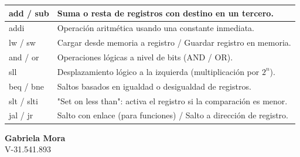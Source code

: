 \documentclass[10pt]{article}
\begin{document}
\vspace{0.6cm}

\begin{center}
    \normalsize 
    \setlength{\tabcolsep}{10pt} 
    \renewcommand{\arraystretch}{1.2} 

    \begin{tabular}{|l|l|}
    \hline
    add / sub & Suma o resta de registros con destino en un tercero. \\ \hline
    addi & Operación aritmética usando una constante inmediata. \\ \hline
    lw / sw & Cargar desde memoria a registro / Guardar registro en memoria. \\ \hline
    and / or & Operaciones lógicas a nivel de bits (AND / OR). \\ \hline
    sll & Desplazamiento lógico a la izquierda (multiplicación por $2^n$). \\ \hline
    beq / bne & Saltos basados en igualdad o desigualdad de registros. \\ \hline
    slt / slti & "Set on less than": activa el registro si la comparación es menor. \\ \hline
    jal / jr & Salto con enlace (para funciones) / Salto a dirección de registro. \\ \hline
    \end{tabular}
\end{center}

\vfill

\begin{flushright}
\textbf{Gabriela Mora} \\
V-31.541.893
\end{flushright}
\end{document}
